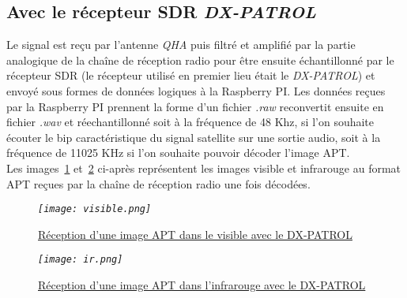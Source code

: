 \documentclass[12pt,fleqn]{book} %
\begin{document}
\subsection{Avec le récepteur SDR \emph{DX-PATROL}}
Le signal est reçu par l'antenne \emph{QHA} puis filtré et amplifié par la partie analogique de la chaîne de réception radio pour être ensuite échantillonné par le récepteur SDR (le récepteur utilisé en premier lieu était le \emph{DX-PATROL}) et envoyé sous formes de données logiques à la Raspberry PI. Les données reçues par la Raspberry PI prennent la forme d'un fichier \emph{.raw} reconvertit ensuite en fichier \emph{.wav} et réechantillonné soit à la fréquence de 48 Khz, si l'on souhaite écouter le bip caractéristique du signal satellite sur une sortie audio, soit à la fréquence de 11025 KHz si l'on souhaite pouvoir décoder l'image APT.
~\\Les images~\ref{visible} et~\ref{ir} ci-après représentent les images visible et infrarouge au format APT reçues par la chaîne de réception radio une fois décodées.
\begin{figure}[H]
	\centering
	\itshape
	\texttt{[image: visible.png]}
	\caption{\label{visible} \underline{Réception d'une image APT dans le visible avec le DX-PATROL}}
\end{figure}
\begin{figure}[H]
	\centering
	\itshape
	\texttt{[image: ir.png]}
	\caption{\label{ir} \underline{Réception d'une image APT dans l'infrarouge avec le DX-PATROL}}
\end{figure}
\end{document}
